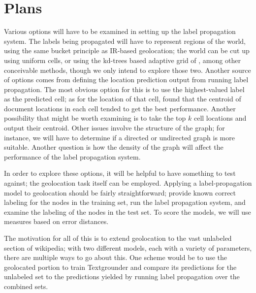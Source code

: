 \documentclass[11pt]{article}
\begin{document}
\section{Plans}
\par
Various options will have to be examined in setting up the label propagation system.
The labels being propagated will have to represent regions of the world, using
the same bucket principle as IR-based geolocation; the world can be cut up
using uniform cells, or using the kd-trees based adaptive grid of
\cite{rolleretal:12}, among other conceivable methods, though we only intend to
explore those two.
Another source of options comes from defining the location prediction output
from running label propagation.
The most obvious option for this is to use the highest-valued label as the predicted cell;
as for the location of that cell, \cite{rolleretal:12} found that the centroid
of document locations in each cell tended to get the best performance.
Another possibility that might be worth examining is to take the top $k$ cell
locations and output their centroid.
Other issues involve the structure of the graph; for instance, we will have to
determine if a directed or undirected graph is more suitable.
Another question is how the density of the graph will affect the performance of
the label propagation system. %
\par
In order to explore these options, it will be helpful to have something to test against;
the geolocation task itself can be employed.
Applying a label-propagation model to geolocation should be fairly straightforward; 
provide known correct labeling for the nodes in the training set, run the label
propagation system, and examine the labeling of the nodes in the test set.
To score the models, we will use measures based on error distances.
\par
The motivation for all of this is to extend geolocation to the vast unlabeled
section of wikipedia; with two different models, each with a variety of
parameters, there are multiple ways to go about this.
One scheme would be to use the geolocated portion to train Textgrounder and
compare its predictions for the unlabeled set to the predictions yielded by
running label propagation over the combined sets.



\end{document}
